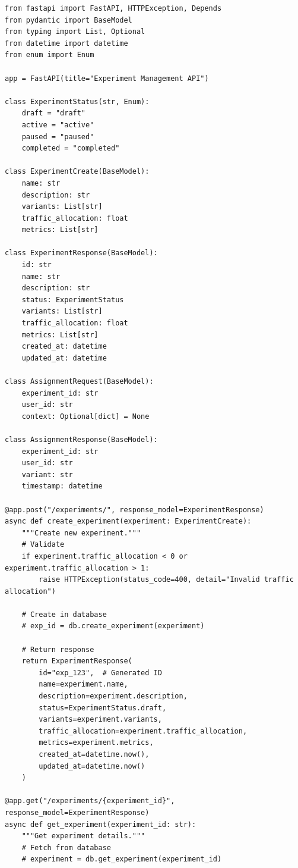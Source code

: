 \lstset{language=Python, caption=REST API for Experiment Management using FastAPI}
\begin{lstlisting}
from fastapi import FastAPI, HTTPException, Depends
from pydantic import BaseModel
from typing import List, Optional
from datetime import datetime
from enum import Enum

app = FastAPI(title="Experiment Management API")

class ExperimentStatus(str, Enum):
    draft = "draft"
    active = "active"
    paused = "paused"
    completed = "completed"

class ExperimentCreate(BaseModel):
    name: str
    description: str
    variants: List[str]
    traffic_allocation: float
    metrics: List[str]

class ExperimentResponse(BaseModel):
    id: str
    name: str
    description: str
    status: ExperimentStatus
    variants: List[str]
    traffic_allocation: float
    metrics: List[str]
    created_at: datetime
    updated_at: datetime

class AssignmentRequest(BaseModel):
    experiment_id: str
    user_id: str
    context: Optional[dict] = None

class AssignmentResponse(BaseModel):
    experiment_id: str
    user_id: str
    variant: str
    timestamp: datetime

@app.post("/experiments/", response_model=ExperimentResponse)
async def create_experiment(experiment: ExperimentCreate):
    """Create new experiment."""
    # Validate
    if experiment.traffic_allocation < 0 or experiment.traffic_allocation > 1:
        raise HTTPException(status_code=400, detail="Invalid traffic allocation")

    # Create in database
    # exp_id = db.create_experiment(experiment)

    # Return response
    return ExperimentResponse(
        id="exp_123",  # Generated ID
        name=experiment.name,
        description=experiment.description,
        status=ExperimentStatus.draft,
        variants=experiment.variants,
        traffic_allocation=experiment.traffic_allocation,
        metrics=experiment.metrics,
        created_at=datetime.now(),
        updated_at=datetime.now()
    )

@app.get("/experiments/{experiment_id}", response_model=ExperimentResponse)
async def get_experiment(experiment_id: str):
    """Get experiment details."""
    # Fetch from database
    # experiment = db.get_experiment(experiment_id)


\end{lstlisting}
